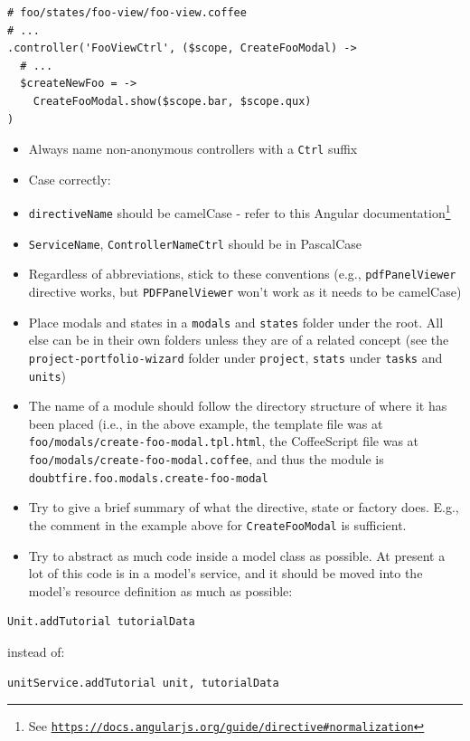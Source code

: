 \documentclass[12pt,a4paper,]{article}
\renewcommand{\href}[2]{#2\footnote{See \texttt{\url{#1}}}}
\providecommand{\tightlist}{%
  \setlength{\itemsep}{0pt}\setlength{\parskip}{0pt}}
\begin{document}
\begin{verbatim}
# foo/states/foo-view/foo-view.coffee
# ...
.controller('FooViewCtrl', ($scope, CreateFooModal) ->
  # ...
  $createNewFoo = ->
    CreateFooModal.show($scope.bar, $scope.qux)
)
\end{verbatim}

\begin{itemize}
\tightlist
\item
  Always name non-anonymous controllers with a \texttt{Ctrl} suffix
\item
  Case correctly:
\item
  \texttt{directiveName} should be camelCase - refer to this
  \href{https://docs.angularjs.org/guide/directive\#normalization}{Angular
  documentation}
\item
  \texttt{ServiceName}, \texttt{ControllerNameCtrl} should be in
  PascalCase
\item
  Regardless of abbreviations, stick to these conventions (e.g.,
  \texttt{pdfPanelViewer} directive works, but \texttt{PDFPanelViewer}
  won't work as it needs to be camelCase)
\item
  Place modals and states in a \texttt{modals} and \texttt{states}
  folder under the root. All else can be in their own folders unless
  they are of a related concept (see the
  \texttt{project-portfolio-wizard} folder under \texttt{project},
  \texttt{stats} under \texttt{tasks} and \texttt{units})
\item
  The name of a module should follow the directory structure of where it
  has been placed (i.e., in the above example, the template file was at
  \texttt{foo/modals/create-foo-modal.tpl.html}, the CoffeeScript file
  was at \texttt{foo/modals/create-foo-modal.coffee}, and thus the
  module is \texttt{doubtfire.foo.modals.create-foo-modal}
\item
  Try to give a brief summary of what the directive, state or factory
  does. E.g., the comment in the example above for
  \texttt{CreateFooModal} is sufficient.
\item
  Try to abstract as much code inside a model class as possible. At
  present a lot of this code is in a model's service, and it should be
  moved into the model's resource definition as much as possible:
\end{itemize}

\begin{verbatim}
Unit.addTutorial tutorialData
\end{verbatim}

instead of:

\begin{verbatim}
unitService.addTutorial unit, tutorialData
\end{verbatim}
\end{document}
